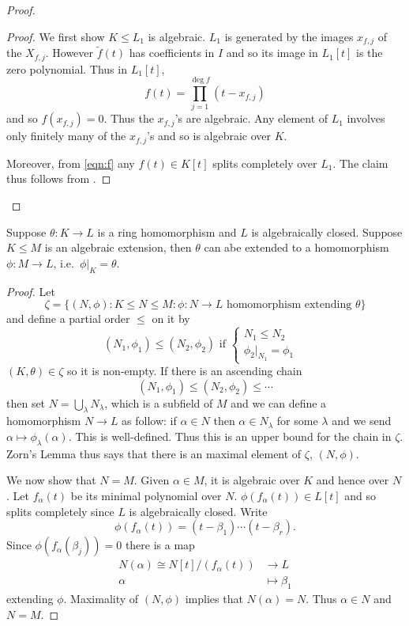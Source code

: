 \documentclass[a4paper]{article}
\begin{document}
\begin{proof}
  \begin{proof}
    We first show \(K \leq L_1\) is algebraic. \(L_1\) is generated by the images \(x_{f, j}\) of the \(X_{f, j}\). However \(\tilde f(t)\) has coefficients in \(I\) and so its image in \(L_1[t]\) is the zero polynomial. Thus in \(L_1[t]\),
    \begin{equation*}
      \label{eqn:f}
      f(t) = \prod_{j = 1}^{\deg f} (t - x_{f, j})
      \tag{\(\dag\)}
    \end{equation*}
    and so \(f(x_{f, j}) = 0\). Thus the \(x_{f, j}\)'s are algebraic. Any element of \(L_1\) involves only finitely many of the \(x_{f, j}\)'s and so is algebraic over \(K\).

    Moreover, from \eqref{eqn:f} any \(f(t) \in K[t]\) splits completely over \(L_1\). The claim thus follows from .
  \end{proof}
\end{proof}

\begin{theorem}
  Suppose \(\theta: K \to L\) is a ring homomorphism and \(L\) is algebraically closed. Suppose \(K \leq M\) is an algebraic extension, then \(\theta\) can abe extended to a homomorphism \(\phi: M \to L\), i.e.\ \(\phi|_K = \theta\).
\end{theorem}

\begin{proof}
  Let
  \[
    \zeta = \{(N, \phi): K \leq N \leq M: \phi: N \to L \text{ homomorphism extending } \theta \}
  \]
  and define a partial order \(\leq\) on it by
  \[
    (N_1, \phi_1) \leq (N_2, \phi_2) \text{ if }
    \begin{cases}
      N_1 \leq N_2 & \\
      \phi_2|_{N_1} = \phi_1 & 
    \end{cases}
  \]
  \((K, \theta) \in \zeta\) so it is non-empty. If there is an ascending chain
  \[
    (N_1, \phi_1) \leq (N_2, \phi_2) \leq \cdots
  \]
  then set \(N = \bigcup_\lambda N_\lambda\), which is a subfield of \(M\) and we can define a homomorphism \(N \to L\) as follow: if \(\alpha \in N\) then \(\alpha \in N_\lambda\) for some \(\lambda\) and we send \(\alpha \mapsto \phi_\lambda(\alpha)\). This is well-defined. Thus this is an upper bound for the chain in \(\zeta\). Zorn's Lemma thus says that there is an maximal element of \(\zeta\), \((N, \phi)\).

  We now show that \(N = M\). Given \(\alpha \in M\), it is algebraic over \(K\) and hence over \(N\). Let \(f_\alpha(t)\) be its minimal polynomial over \(N\). \(\phi(f_\alpha(t)) \in L[t]\) and so splits completely since \(L\) is algebraically closed. Write
  \[
    \phi(f_\alpha(t)) = (t - \beta_1) \cdots (t - \beta_r).
  \]
  Since \(\phi(f_\alpha(\beta_j)) = 0\) there is a map
  \begin{align*}
    N(\alpha) \cong N[t]/(f_\alpha(t)) &\to L \\
    \alpha &\mapsto \beta_1
  \end{align*}
  extending \(\phi\). Maximality of \((N, \phi)\) implies that \(N(\alpha) = N\). Thus \(\alpha \in N\) and \(N = M\).
\end{proof}
\end{document}
